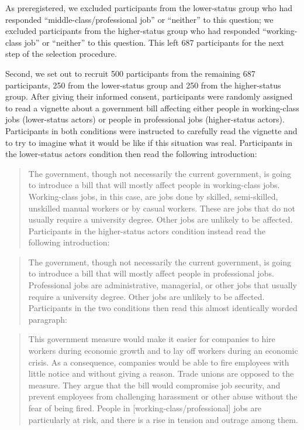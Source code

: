 \documentclass[12pt, letterpaper]{article}
\begin{document}
As preregistered, we excluded participants from the lower-status group
who had responded ``middle-class/professional job'' or ``neither'' to
this question; we excluded participants from the higher-status group who
had responded ``working-class job'' or ``neither'' to this question.
This left 687 participants for the next step of the selection procedure.

Second, we set out to recruit 500 participants from the remaining 687
participants, 250 from the lower-status group and 250 from the
higher-status group. After giving their informed consent, participants
were randomly assigned to read a vignette about a government bill
affecting either people in working-class jobs (lower-status actors) or
people in professional jobs (higher-status actors). Participants in both
conditions were instructed to carefully read the vignette and to try to
imagine what it would be like if this situation was real. Participants
in the lower-status actors condition then read the following
introduction:

\begin{quote}
The government, though not necessarily the current government, is going
to introduce a bill that will mostly affect people in working-class
jobs. Working-class jobs, in this case, are jobs done by skilled,
semi-skilled, unskilled manual workers or by casual workers. These are
jobs that do not usually require a university degree. Other jobs are
unlikely to be affected. Participants in the higher-status actors
condition instead read the following introduction:
\end{quote}

\begin{quote}
The government, though not necessarily the current government, is going
to introduce a bill that will mostly affect people in professional jobs.
Professional jobs are administrative, managerial, or other jobs that
usually require a university degree. Other jobs are unlikely to be
affected. Participants in the two conditions then read this almost
identically worded paragraph:
\end{quote}

\begin{quote}
This government measure would make it easier for companies to hire
workers during economic growth and to lay off workers during an economic
crisis. As a consequence, companies would be able to fire employees with
little notice and without giving a reason. Trade unions are opposed to
the measure. They argue that the bill would compromise job security, and
prevent employees from challenging harassment or other abuse without the
fear of being fired. People in {[}working-class/professional{]} jobs are
particularly at risk, and there is a rise in tension and outrage among
them.
\end{quote}
\end{document}
